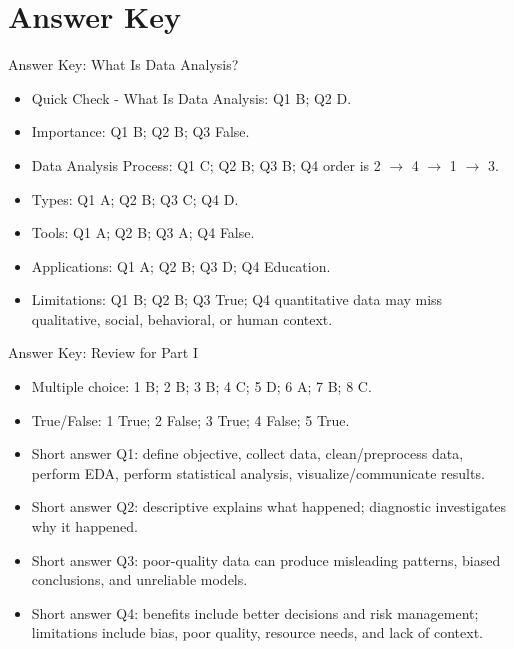 \documentclass[aspectratio=169,11pt]{beamer}
\begin{document}
\section{Answer Key}

\begin{frame}{Answer Key: What Is Data Analysis?}
\begin{itemize}\small
  \item Quick Check - What Is Data Analysis: Q1 B; Q2 D.
  \item Importance: Q1 B; Q2 B; Q3 False.
  \item Data Analysis Process: Q1 C; Q2 B; Q3 B; Q4 order is 2 $\rightarrow$ 4 $\rightarrow$ 1 $\rightarrow$ 3.
  \item Types: Q1 A; Q2 B; Q3 C; Q4 D.
  \item Tools: Q1 A; Q2 B; Q3 A; Q4 False.
  \item Applications: Q1 A; Q2 B; Q3 D; Q4 Education.
  \item Limitations: Q1 B; Q2 B; Q3 True; Q4 quantitative data may miss qualitative, social, behavioral, or human context.
\end{itemize}
\end{frame}

\begin{frame}{Answer Key: Review for Part I}
\begin{itemize}\small
  \item Multiple choice: 1 B; 2 B; 3 B; 4 C; 5 D; 6 A; 7 B; 8 C.
  \item True/False: 1 True; 2 False; 3 True; 4 False; 5 True.
  \item Short answer Q1: define objective, collect data, clean/preprocess data, perform EDA, perform statistical analysis, visualize/communicate results.
  \item Short answer Q2: descriptive explains what happened; diagnostic investigates why it happened.
  \item Short answer Q3: poor-quality data can produce misleading patterns, biased conclusions, and unreliable models.
  \item Short answer Q4: benefits include better decisions and risk management; limitations include bias, poor quality, resource needs, and lack of context.
\end{itemize}
\end{frame}
\end{document}

